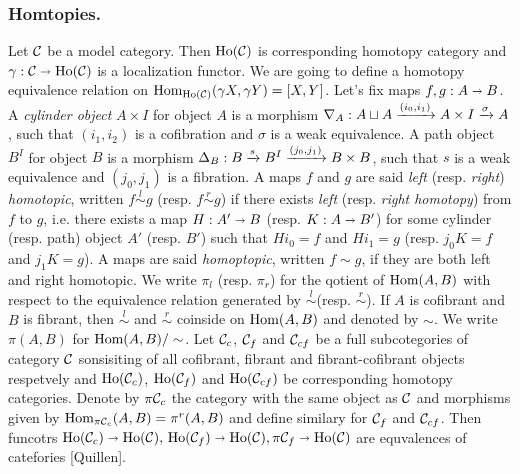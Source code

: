	 \subsubsection{Homtopies.}
	 Let $\mathcal{C}$ be a model category. Then $\operatorname*{\text{Ho}}(\mathcal{C})$ is corresponding homotopy category and
	 $ \gamma : \mathcal{C} \shortrightarrow \operatorname*{\text{Ho}}(\mathcal{C}) $ is a localization functor. We are going to define a homotopy equivalence relation on $\operatorname*{\text{Hom}}_{\operatorname*{\text{Ho}}(\mathcal{C})}(\gamma X, \gamma Y) = [X, Y]$.
	 \newline
	 \newline
	 Let's fix maps $f,g : A \shortrightarrow B $. A \textit{cylinder object} $ A \times I $ for object $ A $ is a morphism 
	 $ \nabla_{A} : A \sqcup A \xrightarrow[]{(i_0, i_1)} A \times I \xrightarrow[]{\sigma} A $, such that $(i_{1}, i_{2})$ is a cofibration and $\sigma$ is a weak equivalence. A path object $ B^I $ for object $B$ is a morphism 
	 $ \Delta_{B} : B \xrightarrow[]{s} B^I \xrightarrow[]{(j_{0}, j_{1})} B \times B $, such that $s$ is a weak equivalence and
	 $ (j_{0}, j_{1}) $ is a fibration.
	 \newline
	 \newline 
	 A maps $f$ and $g$ are said \textit{left} (resp. \textit{right}) \textit{homotopic}, written $ f \overset l\sim g $
	 (resp. $ f \overset r\sim g $)  if there exists \textit{left} (resp. \textit{right homotopy}) from $f$ to $g$, i.e. there exists a map $ H : A' \shortrightarrow B $ (resp. $ K : A \shortrightarrow B' $) for some cylinder (resp. path) object $A'$ (resp. $B'$) such that $ H i_{0} = f $ and $ H i_{1} = g $ (resp. $ j_{0} K = f $ and $ j_{1} K = g $). A maps are said \textit{homoptopic}, written $ f \sim g $, if they are both left and right homotopic. We write $ \pi_{l} $ (resp. $\pi_{r}$) for the qotient of $\operatorname*{\text{Hom}}(A,B)$ 
	 with respect to the equivalence relation generated by $\overset l\sim$(resp. $\overset r\sim$). If $A$ is cofibrant and
	 $B$ is fibrant, then $\overset l\sim$ and $\overset r\sim$ coinside on $\operatorname*{\text{Hom}}(A,B)$ and denoted by $\sim$. We write
	 $\pi(A,B)$ for $\operatorname*{\text{Hom}}(A,B) / \sim$.
	 \newline
	 \newline
	 Let $\mathcal{C}_{c}$, $\mathcal{C}_{f}$ and $\mathcal{C}_{cf}$ be a full subcotegories of category $\mathcal{C}$ sonsisiting of all cofibrant,
	 fibrant and fibrant-cofibrant objects respetvely and $\operatorname*{\text{Ho}}(\mathcal{C}_{c})$, $\operatorname*{\text{Ho}}(\mathcal{C}_{f})$ and $\operatorname*{\text{Ho}}(\mathcal{C}_{cf})$ be corresponding homotopy categories. Denote by $\pi \mathcal{C}_{c}$ the category with the same object as $\mathcal{C}$ and morphisms given by
	 $\operatorname*{\text{Hom}}_{\pi \mathcal{C}_{c}}(A, B) = \pi^{r}(A, B)$ and define similary for $\mathcal{C}_{f}$ and $\mathcal{C}_{cf}$. Then funcotrs
	 $ \Ho(\mc{C}_{c}) \rarr \Ho(\mc{C}), \newline \Ho(\mc{C}_{f}) \rarr \Ho(\mc{C}), \pi \mc{C}_{f} \rarr \Ho(\mc{C}) $ 
	 are equvalences of catefories [Quillen]. 
	 \newline
	 \newline

